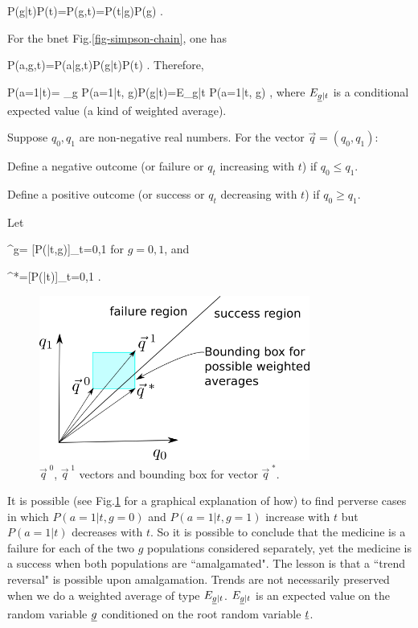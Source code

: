 \beq
P(g|t)P(t)=P(g,t)=P(t|g)P(g)
\;.
\eeq

For the bnet
Fig.\ref{fig-simpson-chain}, 
one has

\beq
P(a,g,t)=P(a|g,t)P(g|t)P(t)
\;.
\eeq
Therefore,

\beq
P(a=1|t)=
\sum_g P(a=1|t, g)P(g|t)=E_{\ul{g}|t}
P(a=1|t, \ul{g})
\;,
\eeq
where $ E_{\underline{g}|t}$ is 
a conditional expected value
 (a kind of weighted average).

Suppose $ q_0, q_1$ are 
non-negative real numbers. 
For the vector $ \vec{q}=(q_0, q_1)$:

Define a negative outcome 
(or failure or $ q_t$ 
increasing with $ t$) 
if $ q_0 \leq q_1$.

Define a positive outcome 
(or success or $ q_t$ 
decreasing with $ t$)
 if $ q_0 \geq q_1$.

Let

\beq
{}^{\;g}=
[P(|t,g)]_{t=0,1}
\;
\eeq
for $g=0,1$, and

\beq
{}^{\;*}=[P(|t)]_{t=0,1}
\;.
\eeq

\begin{figure}[h!]
\centering
\includegraphics[width=3.5in]
{simpson/q-vecs.png}
\caption{$\vec{q}^{\;0}$,
$\vec{q}^{\;1}$ vectors
and bounding box for vector $\vec{q}^{\;*}$.  } 
\label{fig-simpson-q-vecs}
\end{figure}

It is possible (see Fig.\ref{fig-simpson-q-vecs} 
for a graphical explanation of how)
 to find perverse cases in which
 $ P(a=1|t, g=0)$ and $ P(a=1|t, g=1)$
 increase with $ t$ but $ P(a=1|t)$ 
decreases with $ t$. So it is possible 
to conclude that the medicine is a failure
 for each of the two $ g$ populations 
considered separately, yet the medicine 
is a success when both populations are 
``amalgamated". The lesson is that a
 ``trend reversal" is possible 
upon amalgamation. Trends
are not necessarily preserved 
when we do a weighted average of
 type $ E_{\underline{g}|t}$. 
$ E_{\underline{g}|t}$ is an expected value
 on the random variable $ \underline{g}$
 conditioned on the root 
random variable $ \underline{t}$.


